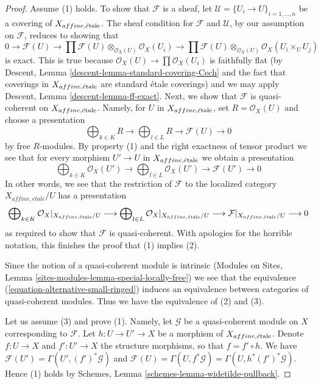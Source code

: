 \begin{proof}
Assume (1) holds. To show that $\mathcal{F}$ is a sheaf, let
$\mathcal{U} = \{U_i \to U\}_{i = 1, \ldots, n}$ be a covering
of $X_{affine, \acute{e}\text{tale}}$. The sheaf condition for $\mathcal{F}$
and $\mathcal{U}$, by our assumption on $\mathcal{F}$,
reduces to showing that
$$
0 \to \mathcal{F}(U) \to
\prod \mathcal{F}(U) \otimes_{\mathcal{O}_X(U)} \mathcal{O}_X(U_i) \to
\prod \mathcal{F}(U) \otimes_{\mathcal{O}_X(U)} \mathcal{O}_X(U_i \times_U U_j)
$$
is exact. This is true because $\mathcal{O}_X(U) \to \prod \mathcal{O}_X(U_i)$
is faithfully flat
(by Descent, Lemma \ref{descent-lemma-standard-covering-Cech} and
the fact that coverings in $X_{affine, \acute{e}\text{tale}}$ are standard \'etale
coverings) and we may apply Descent, Lemma \ref{descent-lemma-ff-exact}.
Next, we show that $\mathcal{F}$ is quasi-coherent on $X_{affine, \acute{e}\text{tale}}$.
Namely, for $U$ in $X_{affine, \acute{e}\text{tale}}$, set $R = \mathcal{O}_X(U)$
and choose a presentation
$$
\bigoplus\nolimits_{k \in K} R
\longrightarrow
\bigoplus\nolimits_{l \in L} R
\longrightarrow
\mathcal{F}(U)
\longrightarrow 0
$$
by free $R$-modules. By property (1) and the right exactness of tensor product
we see that for every morphism $U' \to U$ in $X_{affine, \acute{e}\text{tale}}$
we obtain a presentation
$$
\bigoplus\nolimits_{k \in K} \mathcal{O}_X(U')
\longrightarrow
\bigoplus\nolimits_{l \in L} \mathcal{O}_X(U')
\longrightarrow
\mathcal{F}(U')
\longrightarrow 0
$$
In other words, we see that the restriction of $\mathcal{F}$
to the localized category $X_{affine, etale}/U$ has a presentation
$$
\bigoplus\nolimits_{k \in K} \mathcal{O}_X|_{X_{affine, \acute{e}\text{tale}}/U}
\longrightarrow
\bigoplus\nolimits_{l \in L} \mathcal{O}_X|_{X_{affine, \acute{e}\text{tale}}/U}
\longrightarrow
\mathcal{F}|_{X_{affine, \acute{e}\text{tale}}/U}
\longrightarrow 0
$$
as required to show that $\mathcal{F}$ is quasi-coherent.
With apologies for the horrible notation, this finishes the proof
that (1) implies (2).

\medskip\noindent
Since the notion of a quasi-coherent module is intrinsic
(Modules on Sites, Lemma \ref{sites-modules-lemma-special-locally-free})
we see that the equivalence (\ref{equation-alternative-small-ringed})
induces an equivalence between categories of quasi-coherent modules.
Thus we have the equivalence of (2) and (3).

\medskip\noindent
Let us assume (3) and prove (1). Namely, let
$\mathcal{G}$ be a quasi-coherent module on $X$ corresponding to $\mathcal{F}$.
Let $h : U \to U' \to X$ be a morphism of $X_{affine, \acute{e}\text{tale}}$.
Denote $f : U \to X$ and $f' : U' \to X$ the structure morphisms,
so that $f = f' \circ h$. We have
$\mathcal{F}(U') = \Gamma(U', (f')^*\mathcal{G})$ and
$\mathcal{F}(U) = \Gamma(U, f^*\mathcal{G}) = \Gamma(U, h^*(f')^*\mathcal{G})$.
Hence (1) holds by Schemes, Lemma \ref{schemes-lemma-widetilde-pullback}.
\end{proof}

